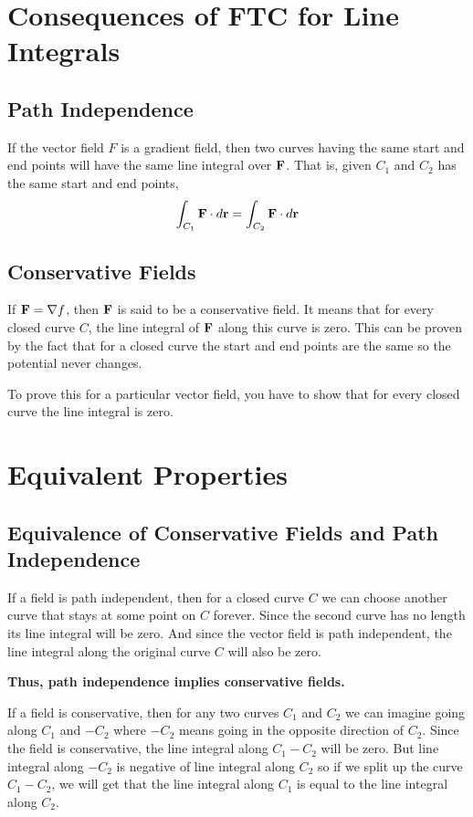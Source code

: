 \section{Consequences of FTC for Line Integrals}

\subsection{Path Independence}

If the vector field $F$ is a gradient field, then two curves having the same start and end points will have the same line integral over ${\bf F }$.
That is, given $C_1$ and  $C_2$ has the same start and end points,
$$ 
\int_{C_1} {\bf F} \cdot d{\bf r} = \int_{C_2} {\bf F} \cdot d{\bf r}
$$


\subsection{Conservative Fields}

If ${\bf F} = \nabla f$, then ${\bf F}$ is said to be a conservative field.
It means that for every closed curve $C$, the line integral of ${\bf F}$ along this curve is zero.
This can be proven by the fact that for a closed curve the start and end points are the same so the potential never changes. 

To prove this for a particular vector field, you have to show that for every closed curve the line integral is zero.

\section{Equivalent Properties}

\subsection{Equivalence of Conservative Fields and Path Independence}

If a field is path independent, then for a closed curve $C$ we can choose another curve that stays at some point on $C$ forever.
Since the second curve has no length its line integral will be zero. 
And since the vector field is path independent, the line integral along the original curve $C$ will also be zero.

{\bf Thus, path independence implies conservative fields.}

If a field is conservative, then for any two curves $C_1$ and $C_2$ we can imagine going along $C_1$ and $-C_2$ where $-C_2$ means going in the opposite direction of $C_2$.
Since the field is conservative, the line integral along $C_1 - C_2$ will be zero.
But line integral along $-C_2$ is negative of line integral along $C_2$ so if we split up the curve $C_1-C_2$, we will get that the line integral along $C_1$ is equal to the line integral along $C_2$.

